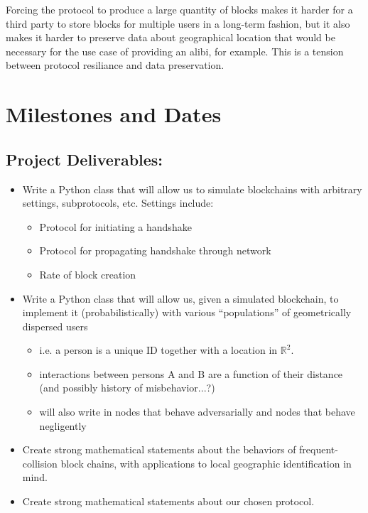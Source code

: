 \documentclass{article}
\begin{document}
Forcing the protocol to produce a large quantity of blocks
makes it harder for a third party to store blocks for multiple users in a long-term fashion,
but it also makes it harder to preserve data about geographical location
that would be necessary for the use case of providing an alibi, for example.
This is a tension between protocol resiliance and data preservation.

\section*{Milestones and Dates}
\subsection*{Project Deliverables:}
\begin{itemize}
	\item Write a Python class that will allow us to simulate
		blockchains with arbitrary settings, subprotocols, etc.
		Settings include:
	\begin{itemize}
		\item Protocol for initiating a handshake
		\item Protocol for propagating handshake through network
		\item Rate of block creation
	\end{itemize}
	\item Write a Python class that will allow us, given a simulated
		blockchain, to implement it (probabilistically) with
		various ``populations'' of geometrically dispersed users
	\begin{itemize}
		\item i.e. a person is a unique ID
			together with a location in $\mathbb{R}^2$.
		\item interactions between persons A and B are
			a function of their distance (and possibly
			history of misbehavior...?)
		\item will also write in nodes that behave adversarially
			and nodes that behave negligently
	\end{itemize}
	\item Create strong mathematical statements about
		the behaviors of frequent-collision block chains,
		with applications to local geographic identification
		in mind.
	\item Create strong mathematical statements about our chosen
		protocol.
\end{itemize}
\end{document}
